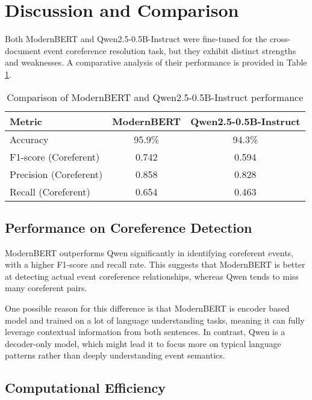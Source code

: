 \documentclass[12pt,a4paper]{article}
\begin{document}
\section{Discussion and Comparison}

Both ModernBERT and Qwen2.5-0.5B-Instruct were fine-tuned for the cross-document event coreference resolution task, but they exhibit distinct strengths and weaknesses. A comparative analysis of their performance is provided in Table \ref{tab:comparison}.

\begin{table}[h]
    \centering
    \begin{tabular}{|l|c|c|}
        \hline
        Metric & ModernBERT & Qwen2.5-0.5B-Instruct \\
        \hline
        Accuracy & 95.9\% & 94.3\% \\
        F1-score (Coreferent) & 0.742 & 0.594 \\
        Precision (Coreferent) & 0.858 & 0.828 \\
        Recall (Coreferent) & 0.654 & 0.463 \\
        \hline
    \end{tabular}
    \caption{Comparison of ModernBERT and Qwen2.5-0.5B-Instruct performance}
    \label{tab:comparison}
\end{table}

\subsection{Performance on Coreference Detection}

ModernBERT outperforms Qwen significantly in identifying coreferent events, with a higher F1-score and recall rate. This suggests that ModernBERT is better at detecting actual event coreference relationships, whereas Qwen tends to miss many coreferent pairs.

One possible reason for this difference is that ModernBERT is encoder based model and trained on a lot of language understanding tasks, meaning it can fully leverage contextual information from both sentences. In contrast, Qwen is a decoder-only model, which might lead it to focus more on typical language patterns rather than deeply understanding event semantics.

\subsection{Computational Efficiency}
\end{document}
